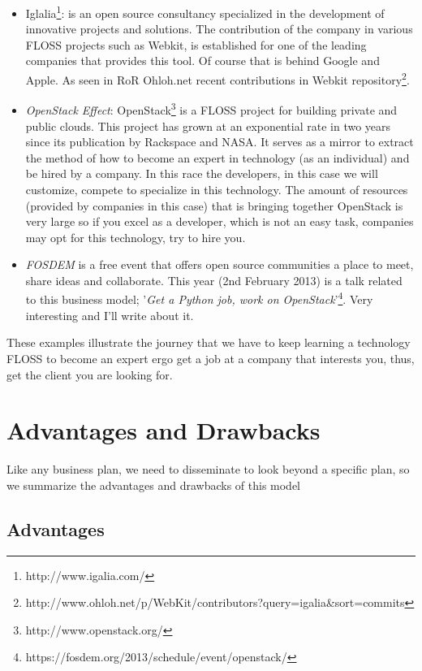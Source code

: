 \documentclass[11pt]{scrartcl}
\begin{document}
\begin{itemize}
    \item Iglalia\footnote{http://www.igalia.com/}: is an open source consultancy specialized in the development of innovative projects and solutions. The contribution of the company in various FLOSS projects such as Webkit, is established for one of the leading companies that provides this tool. Of course that is behind Google and Apple. As seen in RoR Ohloh.net recent contributions in Webkit repository\footnote {http://www.ohloh.net/p/WebKit/contributors?query=igalia\&sort=commits}.
    \item \emph{OpenStack Effect}: OpenStack\footnote{http://www.openstack.org/} is a FLOSS project for building private and public clouds. This project has grown at an exponential rate in two years since its publication by Rackspace and NASA. It serves as a mirror to extract the method of how to become an expert in technology (as an individual) and be hired by a company. In this race the developers, in this case we will customize, compete to specialize in this technology. The amount of resources (provided by companies in this case) that is bringing together OpenStack is very large so if you excel as a developer, which is not an easy task, companies may opt for this technology, try to hire you.
    \item \emph{FOSDEM} is a free event that offers open source communities a place to meet, share ideas and collaborate. This year (2nd February 2013) is a talk related to this business model; '\emph{Get a Python job, work on OpenStack}'\footnote{https://fosdem.org/2013/schedule/event/openstack/}. Very interesting and I'll write about it.
\end{itemize}

\par These examples illustrate the journey that we have to keep learning a technology FLOSS to become an expert ergo get a job at a company that interests you, thus, get the client you are looking for.

\section{Advantages and Drawbacks}

\par Like any business plan, we need to disseminate to look beyond a specific plan, so we summarize the advantages and drawbacks of this model

\subsection{Advantages}
\end{document}
